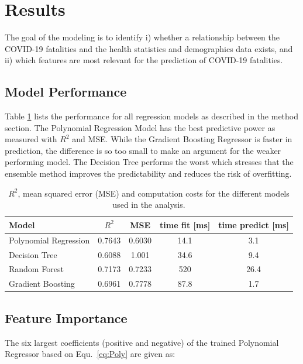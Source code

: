 \documentclass[a4paper, 11pt]{article} %
\begin{document}
\section{Results}
The goal of the modeling is to identify i) whether a relationship between the COVID-19 fatalities and the health statistics and demographics data exists, and ii) which features are most relevant for the prediction of COVID-19 fatalities.

\subsection{Model Performance}

Table \ref{tab:ModelResults} lists the performance for all regression models as described in the method section. The Polynomial Regression Model has the best predictive power as measured with $R^2$ and MSE. While the Gradient Boosting Regressor is faster in prediction, the difference is so too small to make an argument for the weaker performing model. The Decision Tree performs the worst which stresses that the ensemble method improves the predictability and reduces the risk of overfitting.

\begin{table}[htbp]
\small
   \centering
   \begin{tabular}{@{} l | c c c c @{}} %
      \toprule
      Model & $R^2$ & MSE& time fit [ms] &time predict [ms] \\
\midrule
Polynomial Regression &0.7643 & 0.6030  & 14.1 &3.1 \\
Decision Tree & 0.6088 & 1.001 & 34.6 & 9.4\\
Random Forest & 0.7173 & 0.7233 &520 & 26.4 \\
Gradient Boosting & 0.6961 & 0.7778 &87.8 &1.7 \\
 \bottomrule
   \end{tabular}
   \caption{$R^2$, mean squared error (MSE) and computation costs for the different models used in the analysis.}
   \label{tab:ModelResults}
\end{table}

\subsection{Feature Importance} 

The six largest coefficients (positive and negative) of the trained Polynomial Regressor based on Equ.~\ref{eq:Poly} are given as:
\end{document}
